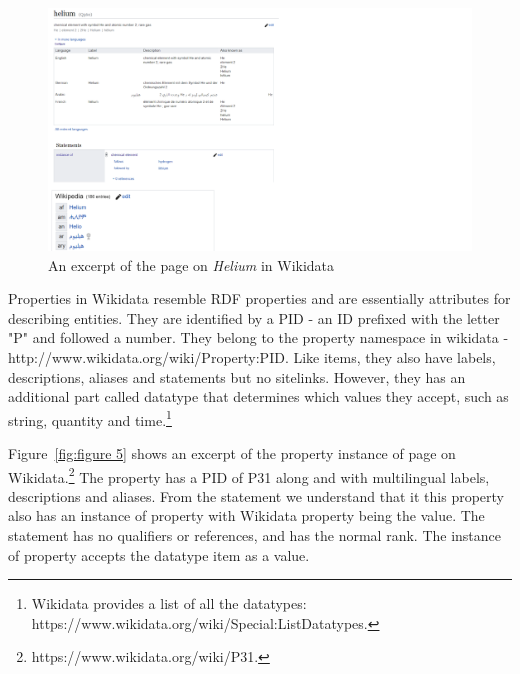 \begin{figure}[h]
  \centering
  \includegraphics[width=0.75 \linewidth]{images/helium.pdf}
  \caption{An excerpt of the page on \textit{Helium} in Wikidata}
  \label{fig:figure 4}
\end{figure}

Properties in Wikidata resemble RDF properties and are essentially attributes for describing entities. They are identified by a PID - an ID prefixed with the letter "P" and followed a number. They belong to the property namespace in wikidata - http://www.wikidata.org/wiki/Property:PID. Like items, they also have labels, descriptions, aliases and statements but no sitelinks. However, they has an additional part called datatype that determines which values they accept, such as string, quantity and time.\footnote{Wikidata provides a list of all the datatypes: https://www.wikidata.org/wiki/Special:ListDatatypes.}

Figure~\ref{fig:figure 5} shows an excerpt of the property instance of page on Wikidata.\footnote{https://www.wikidata.org/wiki/P31.} The property has a PID of P31 along and with multilingual labels, descriptions and aliases. From the statement we understand that it this property also has an instance of property with Wikidata property being the value. The statement has no qualifiers or references, and has the normal rank. The instance of property accepts the datatype item as a value.

